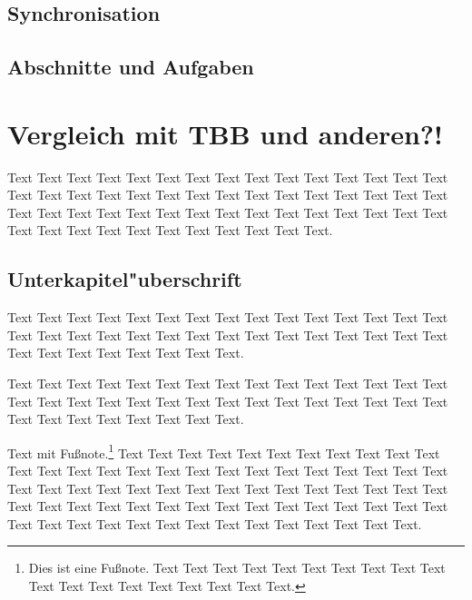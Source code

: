 \documentclass[11pt]{scrartcl}
\begin{document}
\subsection{Synchronisation} 

\subsection{Abschnitte und Aufgaben}

\pagebreak %

\section{Vergleich mit TBB und anderen?!}

Text Text Text Text Text Text Text Text Text Text Text Text Text Text Text Text Text Text
Text Text Text Text Text Text Text Text Text Text Text Text Text Text Text Text Text Text
Text Text Text Text Text Text Text Text Text Text Text Text Text Text Text Text Text Text
Text Text.

\subsection{Unterkapitel"uberschrift}

Text Text Text Text Text Text Text Text Text Text Text Text Text Text Text Text Text Text
Text Text Text Text Text Text Text Text Text Text Text Text Text Text Text Text Text Text
Text Text.


Text Text Text Text Text Text Text Text Text Text Text Text Text Text Text Text Text Text
Text Text Text Text Text Text Text Text Text Text Text Text Text Text Text Text Text Text
Text Text.

Text mit Fußnote.\footnote{Dies ist eine Fußnote. Text Text Text Text Text Text Text Text
Text Text Text Text Text Text Text Text Text Text Text.} Text \cite{Ez99,ABC01} Text Text
Text Text Text Text Text Text Text Text Text Text Text Text Text Text Text Text Text Text
Text Text Text Text Text Text Text Text  Text Text Text Text Text Text Text Text Text Text
Text Text Text Text Text Text Text Text Text Text Text Text Text Text Text Text Text Text
Text Text Text Text Text Text Text Text Text Text Text Text Text.
\end{document}
